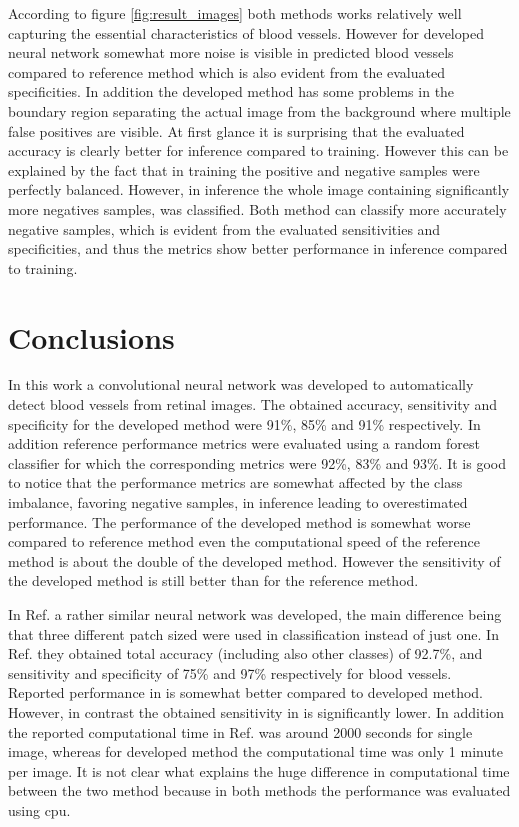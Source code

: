 \documentclass[aps,prb,10pt,twocolumn,groupedaddress]{revtex4-1}
\begin{document}
According to figure \ref{fig:result_images} both methods works relatively well capturing the essential characteristics of blood vessels. However for developed neural network somewhat more noise is visible in predicted blood vessels compared to reference method which is also evident from the evaluated specificities. In addition the developed method has some problems in the boundary region separating the actual image from the background where multiple false positives are visible. At first glance it is surprising that the evaluated accuracy is clearly better for inference compared to training. However this can be explained by the fact that in training the positive and negative samples were perfectly balanced. However, in inference the whole image containing significantly more negatives samples, was classified. Both method can classify more accurately negative samples, which is evident from the evaluated sensitivities and specificities, and thus the metrics show better performance in inference compared to training. 

\section{Conclusions}
\label{sec:conclusions}
In this work a convolutional neural network was developed to automatically detect blood vessels from retinal images. The obtained accuracy, sensitivity and specificity for the developed method were 91\%, 85\% and 91\% respectively. In addition reference performance metrics were evaluated using a random forest classifier for which the corresponding metrics were 92\%, 83\% and 93\%. It is good to notice that the performance metrics are somewhat affected by the class imbalance, favoring negative samples, in inference leading to overestimated performance. The performance of the developed method is somewhat worse compared to reference method even the computational speed of the reference method is about the double of the developed method. However the sensitivity of the developed method is still better than for the reference method.

In Ref. \cite{tan} a rather similar neural network was developed, the main difference being that three different patch sized were used in classification instead of just one. In Ref. \cite{tan} they obtained total accuracy (including also other classes) of 92.7\%, and sensitivity and specificity of 75\% and 97\% respectively for blood vessels. Reported performance in \cite{tan} is somewhat better compared to developed method. However, in contrast the obtained sensitivity in \cite{tan} is significantly lower. In addition the reported computational time in Ref. \cite{tan} was around 2000 seconds for single image, whereas for developed method the computational time was only 1 minute per image. It is not clear what explains the huge difference in computational time between the two method because in both methods the performance was evaluated using cpu.
\end{document}
